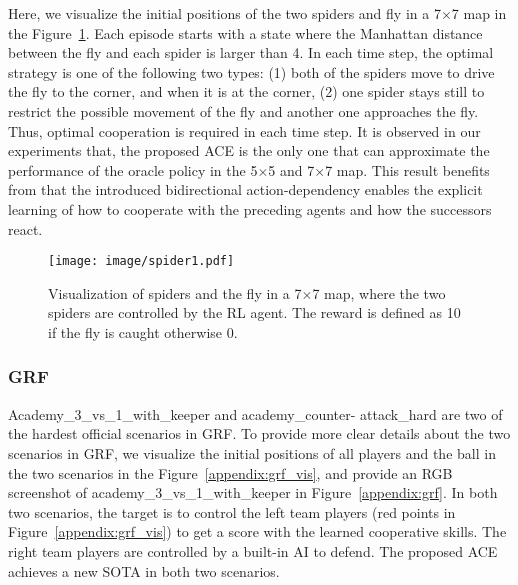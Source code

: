 \documentclass[letterpaper]{article} \usepackage{aaai23}  \usepackage{times}  \usepackage{helvet}  \usepackage{courier}  \usepackage[hyphens]{url}  \usepackage{graphicx} \urlstyle{rm} \def\UrlFont{\rm}  \usepackage{natbib}  \usepackage{caption} \frenchspacing  \setlength{\pdfpagewidth}{8.5in} \setlength{\pdfpageheight}{11in} \usepackage{algorithm}
\begin{document}
Here, we visualize the initial positions of the two spiders and fly in a 7$\times$7 map in the Figure~\ref{appendix:spides-fly}. Each episode starts with a state where the Manhattan distance between the fly and each spider is larger than 4. In each time step, the optimal strategy is one of the following two types: (1) both of the spiders move to drive the fly to the corner, and when it is at the corner, (2) one spider stays still to restrict the possible movement of the fly and another one approaches the fly. Thus, optimal cooperation is required in each time step. It is observed in our experiments that, the proposed ACE is the only one that can approximate the performance of the oracle policy in the 5$\times$5 and 7$\times$7 map. This result benefits from that the introduced bidirectional action-dependency enables the explicit learning of how to cooperate with the preceding agents and how the successors react.

\begin{figure}[h]
    \centering
    \texttt{[image: image/spider1.pdf]}
\vspace{-0.2cm}
    \caption{Visualization of spiders and the fly in a 7$\times$7 map, where the two spiders are controlled by the RL agent. The reward is defined as 10 if the fly is caught otherwise 0.
}
\vspace{-3ex}
    \label{appendix:spides-fly}
\end{figure}

\subsubsection{GRF}
Academy\_3\_vs\_1\_with\_keeper and academy\_counter-
attack\_hard are two of the hardest official scenarios in GRF. To provide more clear details about the two scenarios in GRF, we visualize the initial positions of all players and the ball in the two scenarios in the Figure~\ref{appendix:grf_vis}, and provide an RGB screenshot of academy\_3\_vs\_1\_with\_keeper in Figure~\ref{appendix:grf}. In both two scenarios, the target is to control the left team players (red points in Figure~\ref{appendix:grf_vis}) to get a score with the learned cooperative skills. The right team players are controlled by a built-in AI to defend. The proposed ACE achieves a new SOTA in both two scenarios.
\end{document}

